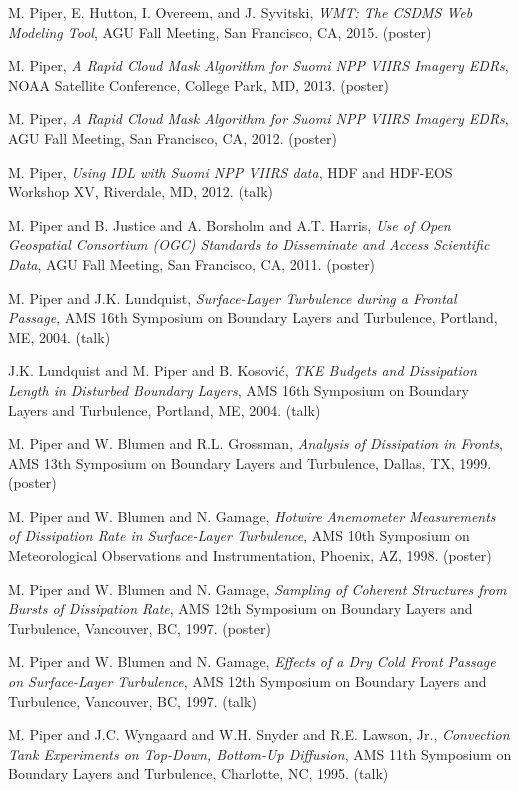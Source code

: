 \documentclass[letterpaper]{resume}
\begin{document}
\vspace{1.0em}
\begin{enumerate}[{[}1{]}]
  \item M. Piper, E. Hutton, I. Overeem, and J. Syvitski, 
    \textit{{WMT}: The {CSDMS} Web Modeling Tool}, {AGU Fall Meeting},
           {San Francisco, CA}, 2015. (poster)
  \item {M. Piper}, \textit{A Rapid Cloud Mask Algorithm for {Suomi}
    {NPP} {VIIRS} {Imagery} {EDRs}}, {NOAA Satellite Conference},
    {College Park, MD}, 2013. (poster)
  \item {M. Piper}, \textit{A Rapid Cloud Mask Algorithm for {Suomi} {NPP}
    {VIIRS} {Imagery} {EDRs}}, {AGU Fall Meeting}, {San Francisco,
    CA}, 2012. (poster)
  \item {M. Piper}, \textit{Using IDL with {Suomi} {NPP} {VIIRS}
    data}, {HDF and HDF-EOS Workshop XV}, {Riverdale, MD}, 2012. (talk)
  \item {M. Piper and B. Justice and A. Borsholm and A.T. Harris},
    \textit{Use of Open Geospatial Consortium (OGC) Standards to
      Disseminate and Access Scientific Data}, {AGU Fall Meeting},
      {San Francisco, CA}, 2011. (poster)
  \item {M. Piper and J.K. Lundquist}, \textit{Surface-Layer
    Turbulence during a Frontal Passage}, {AMS 16th Symposium on
    Boundary Layers and Turbulence}, {Portland, ME}, 2004. (talk)
  \item {J.K. Lundquist and M. Piper and B. Kosovi{\'c}}, \textit{TKE
    Budgets and Dissipation Length in Disturbed Boundary Layers}, {AMS
    16th Symposium on Boundary Layers and Turbulence}, {Portland, ME},
    2004. (talk)
  \item {M. Piper and W. Blumen and R.L. Grossman}, \textit{Analysis
    of Dissipation in Fronts}, {AMS 13th Symposium on Boundary Layers
    and Turbulence}, {Dallas, TX}, 1999. (poster)
  \item {M. Piper and W. Blumen and N. Gamage}, \textit{Hotwire
    Anemometer Measurements of Dissipation Rate in Surface-Layer
    Turbulence}, {AMS 10th Symposium on Meteorological Observations
    and Instrumentation}, {Phoenix, AZ}, 1998. (poster)
  \item {M. Piper and W. Blumen and N. Gamage}, \textit{Sampling of
    Coherent Structures from Bursts of Dissipation Rate}, {AMS 12th
    Symposium on Boundary Layers and Turbulence}, {Vancouver, BC},
    1997. (poster)
  \item {M. Piper and W. Blumen and N. Gamage}, \textit{Effects of a
    Dry Cold Front Passage on Surface-Layer Turbulence}, {AMS 12th
    Symposium on Boundary Layers and Turbulence}, {Vancouver, BC},
    1997. (talk)
  \item {M. Piper and J.C. Wyngaard and W.H. Snyder and R.E. Lawson,
    Jr.}, \textit{Convection Tank Experiments on Top-Down, Bottom-Up
    Diffusion}, {AMS 11th Symposium on Boundary Layers and
    Turbulence}, {Charlotte, NC}, 1995. (talk)
\end{enumerate}
\end{document}
